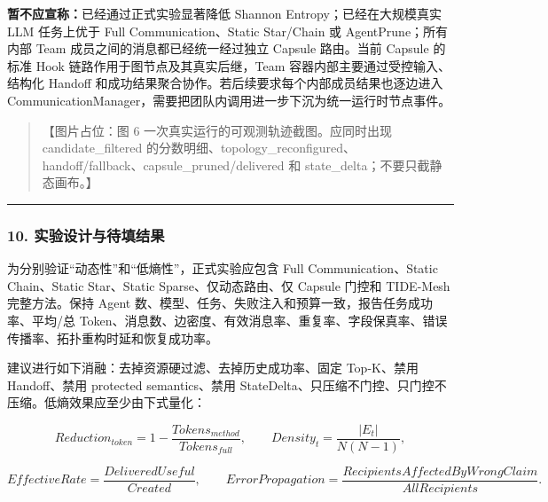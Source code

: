 \documentclass[UTF8,a4paper,12pt]{ctexart}
\begin{document}
\textbf{暂不应宣称：}已经通过正式实验显著降低 Shannon Entropy；已经在大规模真实 LLM 任务上优于 Full Communication、Static Star/Chain 或 AgentPrune；所有内部 Team 成员之间的消息都已经统一经过独立 Capsule 路由。当前 Capsule 的标准 Hook 链路作用于图节点及其真实后继，Team 容器内部主要通过受控输入、结构化 Handoff 和成功结果聚合协作。若后续要求每个内部成员结果也逐边进入 CommunicationManager，需要把团队内调用进一步下沉为统一运行时节点事件。

\begin{quote}
【图片占位：图 6 一次真实运行的可观测轨迹截图。应同时出现 candidate\_filtered 的分数明细、topology\_reconfigured、handoff/fallback、capsule\_pruned/delivered 和 state\_delta；不要只截静态画布。】
\end{quote}

\begin{center}\rule{0.5\linewidth}{0.5pt}\end{center}

\subsubsection{10. 实验设计与待填结果}

为分别验证``动态性''和``低熵性''，正式实验应包含 Full Communication、Static Chain、Static Star、Static Sparse、仅动态路由、仅 Capsule 门控和 TIDE-Mesh 完整方法。保持 Agent 数、模型、任务、失败注入和预算一致，报告任务成功率、平均/总 Token、消息数、边密度、有效消息率、重复率、字段保真率、错误传播率、拓扑重构时延和恢复成功率。

建议进行如下消融：去掉资源硬过滤、去掉历史成功率、固定 Top-K、禁用 Handoff、禁用 protected semantics、禁用 StateDelta、只压缩不门控、只门控不压缩。低熵效果应至少由下式量化：

\[
Reduction_{token}=1-\frac{Tokens_{method}}{Tokens_{full}},\qquad
Density_t=\frac{|E_t|}{N(N-1)},
\]

\[
EffectiveRate=\frac{DeliveredUseful}{Created},\qquad
ErrorPropagation=\frac{RecipientsAffectedByWrongClaim}{AllRecipients}.
\]
\end{document}
